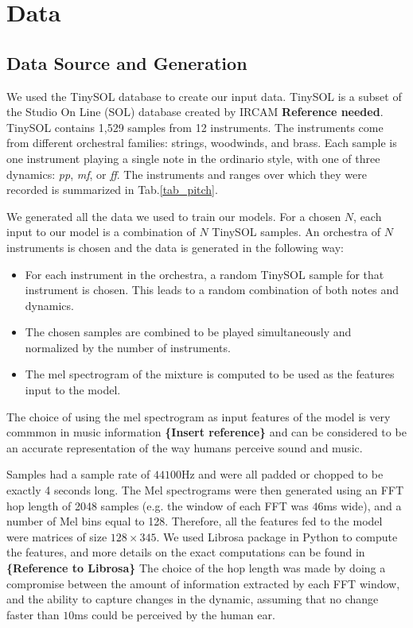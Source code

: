 \documentclass{article}
\begin{document}
\section{Data}

\subsection{Data Source and Generation}
We used the TinySOL database to create our input data. TinySOL is a subset of the Studio On Line (SOL) database created by IRCAM \textbf{Reference needed}. TinySOL contains 1,529 samples from 12 instruments. The instruments come from different orchestral families: strings, woodwinds, and brass. Each sample is one instrument playing a single note in the ordinario style, with one of three dynamics: \textit{pp}, \textit{mf}, or \textit{ff}. The instruments and ranges over which they were recorded is summarized in Tab.\ref{tab_pitch}. 


We generated all the data we used to train our models. For a chosen $N$, each input to our model is a combination of $N$ TinySOL samples. An orchestra of $N$ instruments is chosen and the data is generated in the following way: 

\begin{itemize}
\item For each instrument in the orchestra, a random TinySOL sample for that instrument is chosen. This leads to a random combination of both notes and dynamics.
\item The chosen samples are combined to be played simultaneously and normalized by the number of instruments.
\item The mel spectrogram of the mixture is computed to be used as the features input to the model.
\end{itemize}

The choice of using the mel spectrogram as input features of the model is very commmon in music information \textbf{\{Insert reference\}} and can be considered to be an accurate representation of the way humans perceive sound and music.

Samples had a sample rate of $44100$Hz and were all padded or chopped to be exactly 4 seconds long. The Mel spectrograms were then generated using an FFT hop length of 2048 samples (e.g. the window of each FFT was $46$ms wide), and a number of Mel bins equal to 128. Therefore, all the features fed to the model were matrices of size $128\times 345$. We used Librosa package in Python to compute the features, and more details on the exact computations can be found in \textbf{\{Reference to Librosa\}} The choice of the hop length was made by doing a compromise between the amount of information extracted by each FFT window, and the ability to capture changes in the dynamic, assuming that no change faster than $10$ms could be perceived by the human ear.
\end{document}
